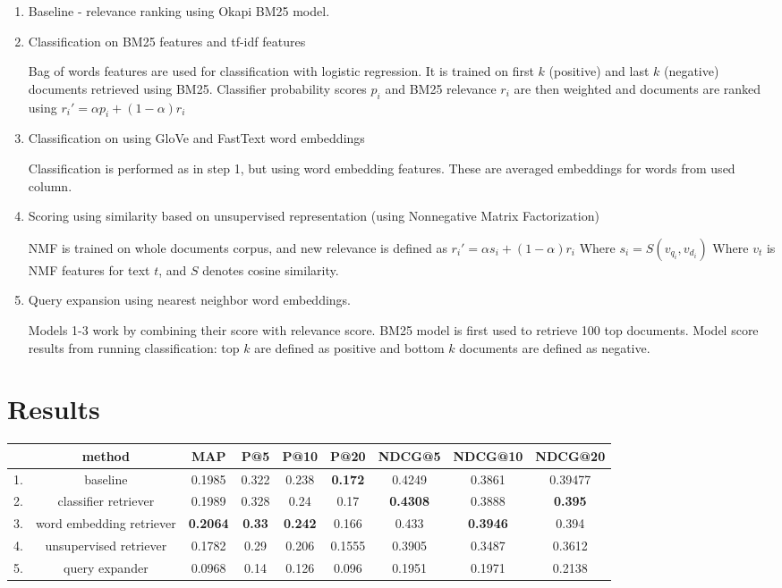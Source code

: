 \documentclass{article}
\begin{document}
\begin{enumerate}

  \item Baseline - relevance ranking using Okapi BM25 \citep{bm25_impro} model.
  \item Classification on BM25 features and tf-idf features \citep{DBLP:journals/corr/abs-1904-08861}
  
  Bag of words features are used for classification with logistic regression. It is trained on first $k$ (positive) and last $k$ (negative) documents retrieved using BM25. Classifier probability scores $p_i$ and BM25 relevance $r_i$ are then weighted and documents are ranked using $r_i' = \alpha p_i + (1 - \alpha) r_i$
  \item Classification on using GloVe \citep{Pennington14glove:global} and FastText \citep{bojanowski2016enriching}  word embeddings
  
  Classification is performed as in step 1, but using word embedding features. These are averaged embeddings for words from used column.
  
  \item Scoring using similarity based on unsupervised representation (using Nonnegative Matrix Factorization)
  
  NMF is trained on whole documents corpus, and new relevance is defined as $r_i' = \alpha s_i + (1 - \alpha) r_i$ Where $s_i = S(v_{q_i}, v_{d_i})$ Where $v_{t}$ is NMF features for text $t$, and $S$ denotes cosine similarity.
  
  \item Query expansion using nearest neighbor word embeddings.
  
Models 1-3 work by combining their score with relevance score. BM25 model is first used to retrieve 100 top documents. Model score results from running classification: top $k$ are defined as positive and bottom $k$ documents are defined as negative.
  
\end{enumerate}

\section{Results}


\begin{tabular}{l*{8}{c}}
& method & MAP & P@5 & P@10 & P@20 & NDCG@5 & NDCG@10 & NDCG@20 \\
\hline
1. & baseline & 0.1985 & 0.322 & 0.238 & \textbf{0.172} & 0.4249 & 0.3861 & 0.39477\\
2. & classifier retriever & 0.1989 & 0.328 & 0.24 & 0.17 & \textbf{0.4308} & 0.3888 & \textbf{0.395} \\
3. & word embedding retriever & \textbf{0.2064} & \textbf{0.33} & \textbf{0.242} & 0.166 & 0.433 & \textbf{0.3946} & 0.394\\
4. & unsupervised retriever & 0.1782 & 0.29 & 0.206 & 0.1555 & 0.3905 & 0.3487 & 0.3612\\
5. & query expander & 0.0968 & 0.14 & 0.126 & 0.096 & 0.1951 & 0.1971 & 0.2138\\

\hline
\end{tabular}
\end{document}
